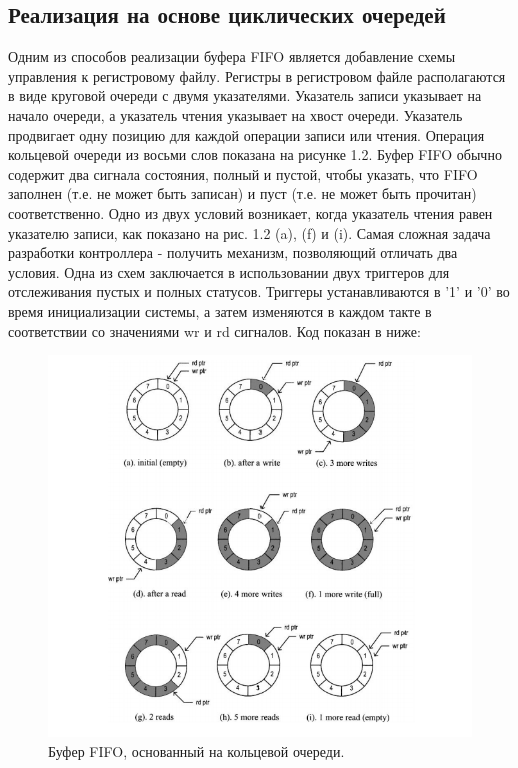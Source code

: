 \subsection{Реализация на основе циклических очередей}
Одним из способов реализации буфера FIFO является добавление схемы управления к регистровому файлу. Регистры в регистровом файле располагаются в виде круговой очереди с двумя указателями. Указатель записи указывает на начало очереди, а указатель чтения указывает на хвост очереди. Указатель продвигает одну позицию для каждой операции записи или чтения. Операция кольцевой очереди из восьми слов показана на рисунке 1.2.
	Буфер FIFO обычно содержит два сигнала состояния, полный и пустой, чтобы указать, что FIFO заполнен (т.е. не может быть записан) и пуст (т.е. не может быть прочитан) соответственно. Одно из двух условий возникает, когда указатель чтения равен указателю записи, как показано на рис. 1.2 (a), (f) и (i). Самая сложная задача разработки контроллера - получить механизм, позволяющий отличать два условия. Одна из схем заключается в использовании двух триггеров  для отслеживания пустых и полных статусов. Триггеры устанавливаются в '1' и '0' во время инициализации системы, а затем изменяются в каждом такте в соответствии со значениями wr и rd сигналов. Код показан в ниже:

\begin{figure}[h]
\centering
\includegraphics[width=1.1\textwidth]{circular_queue}
\caption{Буфер FIFO, основанный на кольцевой очереди.}
\label{circular_queue_label}
\end{figure}

